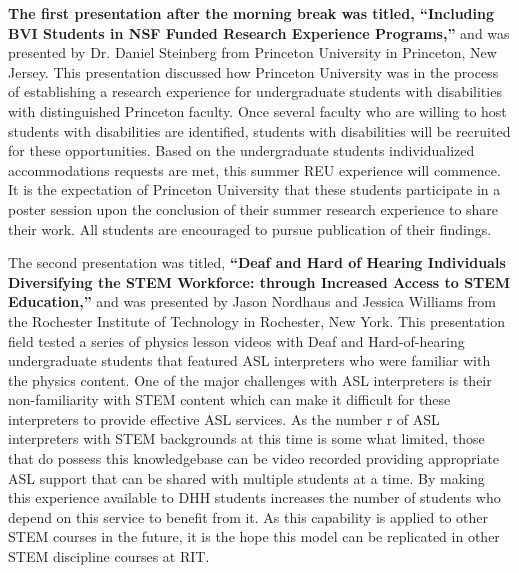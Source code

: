 \documentclass[11.5pt]{sig-alternate}
\begin{document}
\begin{large}
\textbf{The first presentation after the morning break was titled, “Including BVI Students in NSF Funded Research Experience Programs,”} and was presented by Dr. Daniel Steinberg from Princeton University in Princeton, New Jersey. This presentation discussed how Princeton University was in the process of establishing a research experience for undergraduate students with disabilities with distinguished Princeton faculty. Once several faculty who are willing to host students with disabilities are identified, students with disabilities will be recruited for these opportunities. Based on the undergraduate students individualized accommodations requests are met, this summer REU experience will commence. It is the expectation of Princeton University that these students participate in a poster session upon the conclusion of their summer research experience to share their work. All students are encouraged to pursue publication of their findings.

The second presentation was titled, \textbf{“Deaf and Hard of Hearing Individuals Diversifying the STEM Workforce: through Increased Access to STEM Education,”} and was presented by Jason Nordhaus and Jessica Williams from the Rochester Institute of Technology in Rochester, New York. This presentation field tested a series of physics lesson videos with Deaf and Hard-of-hearing undergraduate students that featured ASL interpreters who were familiar with the physics content. One of the major challenges with ASL interpreters is their non-familiarity with STEM content which can make it difficult for these interpreters to provide effective ASL services. As the number r of ASL interpreters with STEM backgrounds at this time is some what limited, those that do possess this knowledgebase can be video recorded providing appropriate ASL support that can be shared with multiple students at a time. By making this experience available to DHH students increases the number of students who depend on this service to benefit from it. As this capability is applied to other STEM courses in the future, it is the hope this model can be replicated in other STEM discipline courses at RIT.


\end{large}
\end{document}
